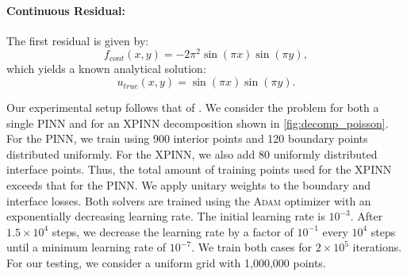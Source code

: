 \paragraph{Continuous Residual:}
The first residual is given by:
\begin{equation}
    f_{cont}(x,y)= -2\pi^2\sin(\pi x) \sin(\pi y),
    \label{eq:continuous_poisson}
\end{equation}
which yields a known analytical solution:
\begin{equation*}
    u_{true}(x,y)=\sin(\pi x) \sin(\pi y).
\end{equation*}

Our experimental setup follows that of \textcite{müller2023achieving}.
We consider the problem for both a single PINN and for an XPINN decomposition shown in \autoref{fig:decomp_poisson}.
For the PINN, we train using 900 interior points and 120 boundary points distributed uniformly.
For the XPINN, we also add 80 uniformly distributed interface points. Thus, the total amount of training points used for the XPINN exceeds that for the PINN. We apply unitary weights to the boundary and interface losses.
Both solvers are trained using the \textsc{Adam} optimizer with an exponentially decreasing learning rate.
The initial learning rate is $10^{-3}$.
After $1.5\times 10^4$ steps, we decrease the learning rate by a factor of $10^{-1}$ every $10^4$ steps until a minimum learning rate of $10^{-7}$.
We train both cases for $2\times 10^5$ iterations. For our testing, we consider a uniform grid with 1,000,000 points. 

